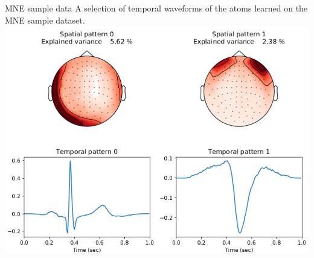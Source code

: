 \documentclass{beamer}
\begin{document}
\begin{frame}{MNE sample data}
A selection of temporal waveforms of the atoms learned on the MNE sample dataset.\\[1em]
\centering
\includegraphics[height=0.7\textheight]{artifacts}
\end{frame}


\end{document}
